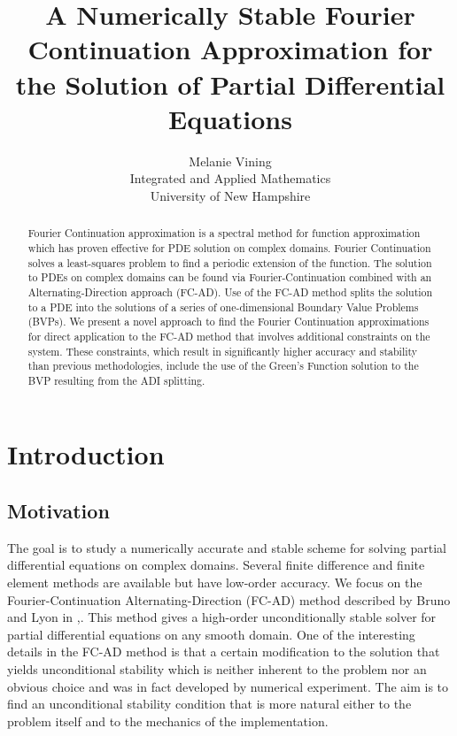 \documentclass[11pt]{amsart}
\title{A Numerically Stable Fourier Continuation Approximation for the Solution of Partial Differential Equations}
\author{Melanie Vining \\ Integrated and Applied Mathematics \\University of New Hampshire}
\begin{document}
\maketitle
\begin{abstract}
Fourier Continuation approximation is a spectral method for function approximation which has proven effective for PDE solution on complex domains. Fourier Continuation solves a least-squares problem to find a periodic extension of the function.  The solution to PDEs on complex domains can be found via Fourier-Continuation combined with an Alternating-Direction approach (FC-AD).  Use of the FC-AD method splits the solution to a PDE into the solutions of a series of one-dimensional Boundary Value Problems (BVPs).  We present a novel approach to find the Fourier Continuation approximations for direct application to the FC-AD method that involves additional constraints on the system.  These constraints, which result in significantly higher accuracy and stability than previous methodologies, include the use of the Green's Function solution to the BVP resulting from the ADI splitting.  
\end{abstract}
\newpage



\section{Introduction} 
\subsection{Motivation} 
The goal is to study a numerically accurate and stable scheme for solving partial differential equations on complex domains.  Several finite difference and finite element methods are available but have low-order accuracy.  We focus on the Fourier-Continuation Alternating-Direction (FC-AD) method described by Bruno and Lyon in \cite{FCAD1},\cite{FCAD2}. This method gives a high-order unconditionally stable solver for partial differential equations on any smooth domain.  One of the interesting details in the FC-AD method is that a certain modification to the solution that yields unconditional stability which is neither inherent to the problem nor an obvious choice and was in fact developed by numerical experiment. The aim is to find an unconditional stability condition that is more natural either to the problem itself and to the mechanics of the implementation.  
\end{document}
